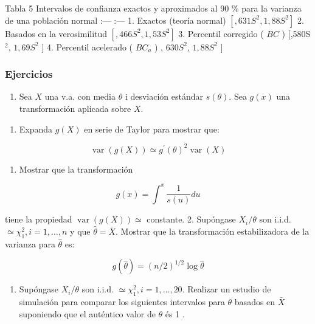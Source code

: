 \documentclass[
]{article}
\providecommand{\tightlist}{%
  \setlength{\itemsep}{0pt}\setlength{\parskip}{0pt}}
\begin{document}
Tabla 5
\textbar{} Intervalos de confianza exactos y aproximados al 90 \% para la varianza de una población normal \textbar{} \textbar{}
\textbar{} :--- \textbar{} :--- \textbar{}
\textbar{} 1. Exactos (teoría normal) \textbar{} \(\left[, 631 S^{2}, 1,88 S^{2}\right]\) \textbar{}
\textbar{} 2. Basados en la verosimilitud \textbar{} \(\left[, 466 S^{2}, 1,53 S^{2}\right]\) \textbar{}
\textbar{} 3. Percentil corregido ( \(B C\) ) \textbar{} {[},580S \({ }^{2}\), \(1,69 S^{2}\) {]} \textbar{}
\textbar{} 4. Percentil acelerado ( \(B C_{a}\) ) \textbar{} , \(630 S^{2}\), \(1,88 S^{2}\) {]} \textbar{}

\subsubsection{Ejercicios}\label{ejercicios-2}

\begin{enumerate}
\def\labelenumi{\arabic{enumi}.}
\tightlist
\item
  Sea \(X\) una v.a. con media \(\theta\) i desviación estándar \(s(\theta)\). Sea \(g(x)\) una transformación aplicada sobre \(X\).
\end{enumerate}

\begin{enumerate}
\def\labelenumi{\alph{enumi})}
\tightlist
\item
  Expanda \(g(X)\) en serie de Taylor para mostrar que:
\end{enumerate}

\[
\operatorname{var}(g(X)) \simeq g^{\prime}(\theta)^{2} \operatorname{var}(X)
\]

\begin{enumerate}
\def\labelenumi{\alph{enumi})}
\setcounter{enumi}{1}
\tightlist
\item
  Mostrar que la transformación
\end{enumerate}

\[
g(x)=\int^{x} \frac{1}{s(u)} d u
\]

tiene la propiedad \(\operatorname{var}(g(X)) \simeq\) constante.
2. Supóngase \(X_{i} / \theta\) son i.i.d. \(\simeq \chi_{1}^{2}, i=1, \ldots, n\) y que \(\hat{\theta}=\bar{X}\). Mostrar que la transformación estabilizadora de la varianza para \(\hat{\theta}\) es:

\[
g(\hat{\theta})=(n / 2)^{1 / 2} \log \hat{\theta}
\]

\begin{enumerate}
\def\labelenumi{\arabic{enumi}.}
\setcounter{enumi}{2}
\tightlist
\item
  Supóngase \(X_{i} / \theta\) son i.i.d. \(\simeq \chi_{1}^{2}, i=1, \ldots, 20\). Realizar un estudio de simulación para comparar los siguientes intervalos para \(\theta\) basados en \(\bar{X}\) suponiendo que el auténtico valor de \(\theta\) és 1 .
\end{enumerate}
\end{document}
